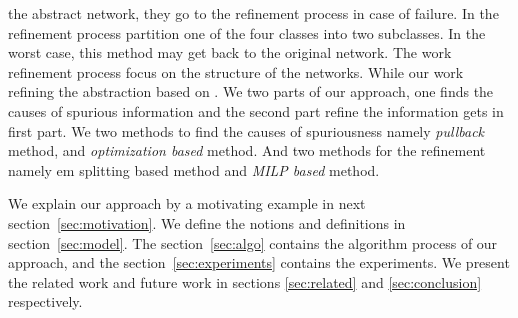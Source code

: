 the abstract network, they go to the refinement process in case of failure.  
In the refinement process \cite{elboher2020abstraction} partition one of the four classes into two subclasses. 
In the worst case, this method may get back to the original network. 
The work \cite{elboher2020abstraction} refinement process focus on the structure of the networks. 
While our work refining the abstraction based on \deeppoly{}.
We two parts of our approach, one finds the causes of spurious information and the second part refine the 
information gets in first part. We two methods to find the causes of spuriousness namely {\em pullback} method, and 
{\em optimization based} method. And two methods for the refinement namely {em splitting} based method and 
{\em MILP based} method.    

We explain our approach by a motivating example in next section~\ref*{sec:motivation}. 
We define the notions and definitions in section~\ref{sec:model}. The section~\ref{sec:algo} contains the 
algorithm process of our approach, and the section~\ref{sec:experiments} contains the experiments. 
We present the related work and future work in sections \ref{sec:related} and \ref{sec:conclusion} respectively. 


